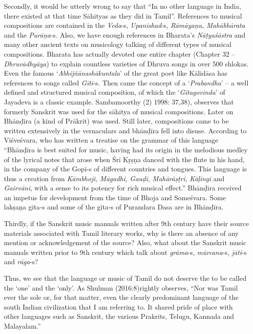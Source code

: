 Secondly, it would be utterly wrong to say that “In no other language in India, there existed at that time Sāhityas as they did in Tamil”. References to musical compositions are contained in the \textit{Veda}-s, \textit{Upanishad}-s, \textit{Rāmāyaṇa, Mahābhārata} and the \textit{Purāṇa}-s. Also, we have enough references in Bharata’s \textit{Nāṭyaśāstra} and many other ancient texts on musicology talking of different types of musical compositions. Bharata has actually devoted one entire chapter (Chapter 32 – \textit{Dhruvādhyāya}) to explain countless varieties of Dhruva songs in over 500 shlokas. Even the famous ‘\textit{Abhijñānashākuntala}’ of the great poet like Kālidāsa has references to songs called \textit{Gīti}-s. Then came the concept of a ‘\textit{Prabandha}’ – a well defined and structured musical composition, of which the ‘\textit{Gītagovinda}’ of Jayadeva is a classic example. Sambamoorthy (2) 1998: 37,38), observes that formerly Sanskrit was used for the sāhitya of musical compositions. Later on Bhānḍīra (a kind of Prākrit) was used. Still later, compositions came to be written extensively in the vernaculars and bhānḍīra fell into disuse. According to Viśveśvara, who has written a treatise on the grammar of this language “Bhānḍīra is best suited for music, having had its origin in the melodious medley of the lyrical notes that arose when Śrī Kṛṣṇa danced with the flute in his hand, in the company of the Gopī-s of different countries and tongues. This language is thus a creation from \textit{Kāmbhoji, Māgadhi, Gauḍi, Mahārāṣṭri, Kāḷingi} and \textit{Gairvāni}, with a sense to its potency for rich musical effect.” Bhānḍīra received an impetus for development from the time of Bhoja and Someśvara. Some lakṣaṇa gīta-s and some of the gīta-s of Purandara Dasa are in Bhānḍīra.

Thirdly, if the Sanskrit music manuals written after 9th century have their source materials associated with Tamil literary works, why is there an absence of any mention or acknowledgement of the source? Also, what about the Sanskrit music manuals written prior to 9th century which talk about \textit{grāma}-s, \textit{mūrcana}-s, \textit{jāti}-s and \textit{rāga}-s?

Thus, we see that the language or music of Tamil do not deserve the to be called the ‘one’ and the ‘only’. As Shulman (2016:8)rightly observes, “Nor was Tamil ever the sole or, for that matter, even the clearly predominant language of the south Indian civilization that I am referring to. It shared pride of place with other languages such as Sanskrit, the various Prakrits, Telugu, Kannada and Malayalam.”

